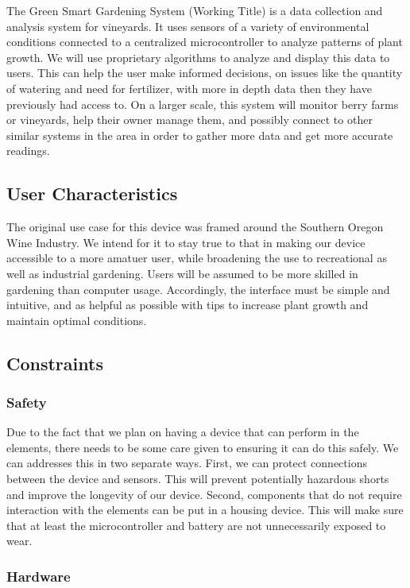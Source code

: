 \documentclass[IEEEtran,letterpaper,10pt,titlepage,fleqn,draftclsnofoot,onecolumn]{article}
\begin{document}
The Green Smart Gardening System (Working Title) is a data collection and analysis system for vineyards. It uses sensors of a variety of environmental conditions connected to a centralized microcontroller to analyze patterns of plant growth. We will use proprietary algorithms to analyze and display this data to users. This can help the user make informed decisions, on issues like the quantity of watering and need for fertilizer, with more in depth data then they have previously had access to. On a larger scale, this system will monitor berry farms or vineyards, help their owner manage them, and possibly connect to other similar systems in the area in order to gather more data and get more accurate readings. 

\subsection{User Characteristics}

The original use case for this device was framed around the Southern Oregon Wine Industry. We intend for it to stay true to that in making our device accessible to a more amatuer user, while broadening the use to recreational as well as industrial gardening. Users will be assumed to be more skilled in gardening than computer usage. Accordingly, the interface must be simple and intuitive, and as helpful as possible with tips to increase plant growth and maintain optimal conditions.   

\subsection{Constraints}
\subsubsection{Safety}

Due to the fact that we plan on having a device that can perform in the elements, there needs to be some care given to ensuring it can do this safely. We can addresses this in two separate ways. First, we can protect connections between the device and sensors. This will prevent potentially hazardous shorts and improve the longevity of our device. Second, components that do not require interaction with the elements can be put in a housing device. This will make sure that at least the microcontroller and battery are not unnecessarily exposed to wear. 

\subsubsection{Hardware}
\end{document}
